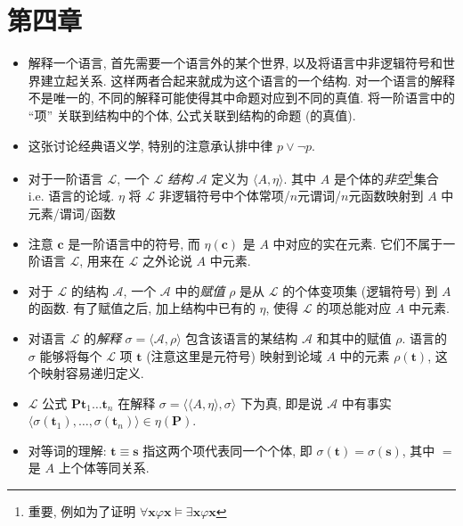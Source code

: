 \documentclass[a4paper]{article}
\begin{document}
\section{第四章}
\begin{itemize}
    \item 解释一个语言, 首先需要一个语言外的某个世界, 以及将语言中非逻辑符号和世界建立起关系.
        这样两者合起来就成为这个语言的一个结构.
        对一个语言的解释不是唯一的, 不同的解释可能使得其中命题对应到不同的真值.
        将一阶语言中的 ``项'' 关联到结构中的个体, 公式关联到结构的命题 (的真值).

    \item 这张讨论经典语义学, 特别的注意承认排中律 $p\lor\lnot p$.

    \item 对于一阶语言 $\mathcal{L}$, 一个 $\mathcal{L}$ \emph{结构} $\mathcal{A}$ 定义为 $\langle A, \eta \rangle$.
        其中 $A$ 是个体的\emph{非空}\footnote{重要, 例如为了证明 $\forall\mathbf{x}\varphi\mathbf{x}\models\exists\mathbf{x}\varphi\mathbf{x}$}集合 i.e. 语言的论域.
        $\eta$ 将 $\mathcal{L}$ 非逻辑符号中个体常项/$n$元谓词/$n$元函数映射到 $A$ 中元素/谓词/函数

    \item 注意 $\mathbf{c}$ 是一阶语言中的符号, 而 $\eta(\mathbf{c})$ 是 $A$ 中对应的实在元素. 它们不属于一阶语言 $\mathcal{L}$,
        用来在 $\mathcal{L}$ 之外论说 $A$ 中元素.

    \item 对于 $\mathcal{L}$ 的结构 $\mathcal{A}$, 一个 $\mathcal{A}$ 中的\emph{赋值} $\rho$ 是从 $\mathcal{L}$ 的个体变项集 (逻辑符号) 到 $A$ 的函数.
        有了赋值之后, 加上结构中已有的 $\eta$, 使得 $\mathcal{L}$ 的项总能对应 $A$ 中元素.

    \item 对语言 $\mathcal{L}$ 的\emph{解释} $\mathcal{\sigma}=\langle \mathcal{A}, \rho \rangle$ 包含该语言的某结构 $\mathcal{A}$ 和其中的赋值 $\rho$.
        语言的 $\sigma$ 能够将每个 $\mathcal{L}$ 项 $\mathbf{t}$ (注意这里是元符号) 映射到论域 $A$ 中的元素 $\rho(\mathbf{t})$, 这个映射容易递归定义.

    \item $\mathcal{L}$ 公式 $\mathbf{P}\mathbf{t}_1\ldots\mathbf{t}_n$ 在解释 $\sigma = \langle \langle A, \eta\rangle, \sigma\rangle$ 下为真, 即是说
        $\mathcal{A}$ 中有事实 $\langle \sigma(\mathbf{t}_1), \ldots, \sigma(\mathbf{t}_n) \rangle \in \eta(\mathbf{P})$.

    \item 对等词的理解: $\mathbf{t}\equiv\mathbf{s}$ 指这两个项代表同一个个体, 即 $\sigma(\mathbf{t}) = \sigma(\mathbf{s})$, 其中 $=$ 是 $A$ 上个体等同关系.


\end{itemize}
\end{document}
